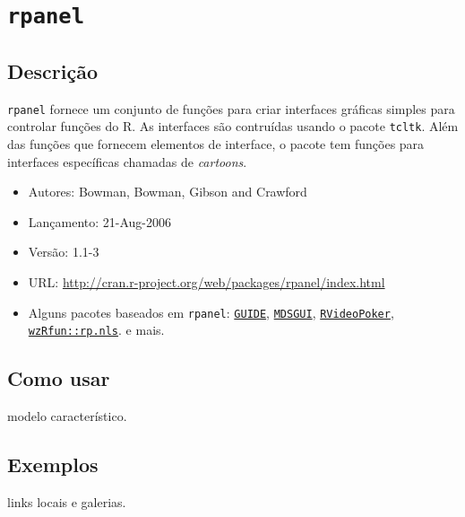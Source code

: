 \section{\texttt{rpanel}}

\subsection{Descrição}


\begin{frame}

  \texttt{rpanel} fornece um conjunto de funções para criar interfaces
  gráficas simples para controlar funções do R. As interfaces são
  contruídas usando o pacote \texttt{tcltk}. Além das funções que
  fornecem elementos de interface, o pacote tem funções para interfaces
  específicas chamadas de \emph{cartoons}.

  \begin{itemize}
  \item Autores: Bowman, Bowman, Gibson and Crawford
  \item Lançamento: 21-Aug-2006
  \item Versão: 1.1-3
  \item URL:
    \url{http://cran.r-project.org/web/packages/rpanel/index.html}
\end{itemize}

\end{frame}

\begin{frame}

\begin{itemize}
\item Alguns pacotes baseados em \texttt{rpanel}:
  \href{http://cran.r-project.org/web/packages/GUIDE/index.html}{\texttt{GUIDE}},
  \href{http://cran.r-project.org/web/packages/MDSGUI/index.html}{\texttt{MDSGUI}},
  \href{http://cran.r-project.org/web/packages/RVideoPoker/index.html}{\texttt{RVideoPoker}},
  \href{https://github.com/walmes/wzRfun/blob/master/R/rp.nls.R}{\texttt{wzRfun::rp.nls}}.
  e mais.
\end{itemize}

\end{frame}


\subsection{Como usar}

\begin{frame}

modelo característico.

\end{frame}


\begin{frame}

\subsection{Exemplos}

links locais e galerias.

\end{frame}